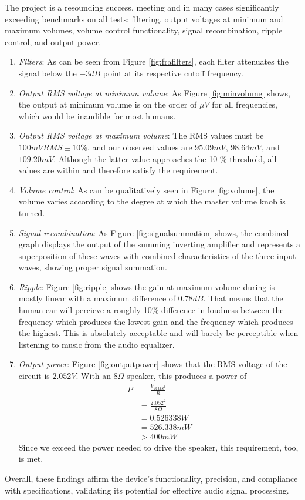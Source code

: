 \documentclass[notitlepage, 12pt]{report}
\begin{document}
The project is a resounding success, meeting and in many cases significantly exceeding benchmarks 
on all tests: filtering, output voltages at minimum and maximum volumes, volume control functionality, 
signal recombination, ripple control, and output power. 
\begin{enumerate}
    \item \emph{Filters}: As can be seen from Figure \ref{fig:frafilters}, each filter 
    attenuates the signal below the $-3dB$ point at its respective cutoff frequency. 
    \item \emph{Output RMS voltage at minimum volume}: As Figure \ref{fig:minvolume} shows, 
    the output at minimum volume is on the order of $\mu V$ for all frequencies, 
    which would be inaudible for most humans. 
    \item \emph{Output RMS voltage at maximum volume}: The RMS values must be $100 mVRMS \pm 10 \%$, 
    and our observed values are $95.09 mV$, $98.64 mV$, 
    and $109.20 mV$. Although the latter value approaches the 10 \% threshold, all values are  
    within and therefore satisfy the requirement. 
    \item \emph{Volume control}: As can be qualitatively seen in Figure \ref{fig:volume}, 
    the volume varies according to the degree at which the master volume knob is turned. 
    \item \emph{Signal recombination}: As Figure \ref{fig:signalsummation} shows, the combined 
    graph displays the output of the summing inverting amplifier and represents a superposition 
    of these waves with combined characteristics of the three input waves, showing proper signal 
    summation. 

    \item \emph{Ripple}: Figure \ref{fig:ripple} shows the gain at maximum volume during is mostly
    linear with a maximum difference of $0.78 dB$. That means 
    that the human ear will percieve a roughly 10\% difference in loudness between the frequency 
    which produces the lowest gain and the frequency which produces the highest. This is 
    absolutely acceptable and will barely be perceptible when listening to music from the 
    audio equalizer. 
    \item \emph{Output power}: Figure \ref{fig:outputpower} shows that the RMS voltage of the circuit 
    is $2.052 V$. With an $8\Omega$ speaker, this produces a power of
    \begin{align*}
        P &= \frac{V_{RMS^2}}{R} \\
        &= \frac{2.052^2}{8 \Omega} \\
        &= 0.526338 W \\
        &= 526.338 mW \\
        &>400 mW
    \end{align*}
    Since we exceed the power needed to drive the speaker, this requirement, too, is met. 
\end{enumerate}
Overall, these findings affirm the device's functionality, precision, and compliance with specifications, 
validating its potential for effective audio signal processing.
\end{document}
